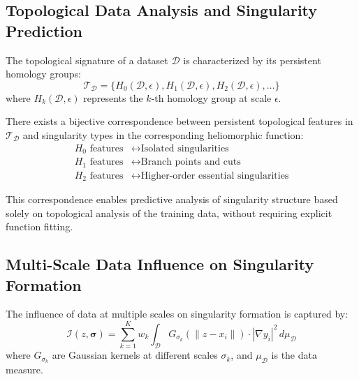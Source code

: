 \subsection{Topological Data Analysis and Singularity Prediction}

\begin{definition}
The topological signature of a dataset $\mathcal{D}$ is characterized by its persistent homology groups:
\begin{equation}
\mathcal{T}_{\mathcal{D}} = \{H_0(\mathcal{D}, \epsilon), H_1(\mathcal{D}, \epsilon), H_2(\mathcal{D}, \epsilon), \ldots\}
\end{equation}
where $H_k(\mathcal{D}, \epsilon)$ represents the $k$-th homology group at scale $\epsilon$.
\end{definition}

\begin{theorem}
There exists a bijective correspondence between persistent topological features in $\mathcal{T}_{\mathcal{D}}$ and singularity types in the corresponding heliomorphic function:
\begin{align}
H_0 \text{ features} &\leftrightarrow \text{Isolated singularities} \\
H_1 \text{ features} &\leftrightarrow \text{Branch points and cuts} \\
H_2 \text{ features} &\leftrightarrow \text{Higher-order essential singularities}
\end{align}
\end{theorem}

This correspondence enables predictive analysis of singularity structure based solely on topological analysis of the training data, without requiring explicit function fitting.

\subsection{Multi-Scale Data Influence on Singularity Formation}

\begin{definition}
The influence of data at multiple scales on singularity formation is captured by:
\begin{equation}
\mathcal{I}(z, \boldsymbol{\sigma}) = \sum_{k=1}^{K} w_k \int_{\mathcal{D}} G_{\sigma_k}(\|z - x_i\|) \cdot |\nabla y_i|^2 \, d\mu_{\mathcal{D}}
\end{equation}
where $G_{\sigma_k}$ are Gaussian kernels at different scales $\sigma_k$, and $\mu_{\mathcal{D}}$ is the data measure.
\end{definition}

